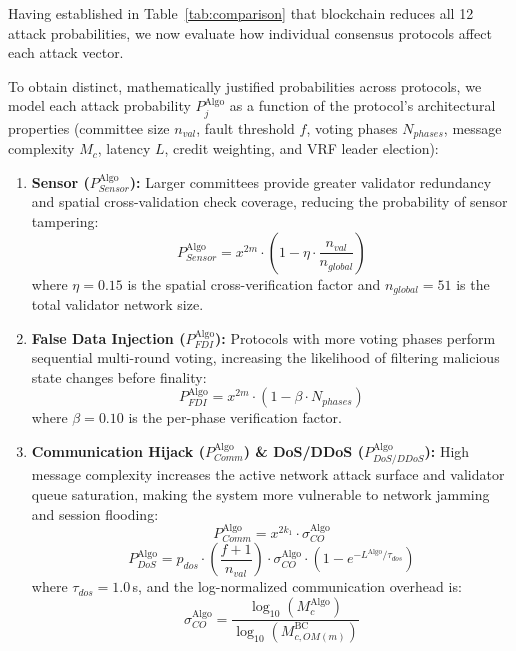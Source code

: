 \documentclass[10pt,twocolumn,journal]{IEEEtran}
\begin{document}
Having established in Table~\ref{tab:comparison} that blockchain reduces all 12 attack probabilities, we now evaluate how individual consensus protocols affect each attack vector. 

To obtain distinct, mathematically justified probabilities across protocols, we model each attack probability $P_j^{\text{Algo}}$ as a function of the protocol's architectural properties (committee size $n_{val}$, fault threshold $f$, voting phases $N_{phases}$, message complexity $M_c$, latency $L$, credit weighting, and VRF leader election):
\begin{enumerate}[leftmargin=*]
    \item \textbf{Sensor ($P_{Sensor}^{\text{Algo}}$):} Larger committees provide greater validator redundancy and spatial cross-validation check coverage, reducing the probability of sensor tampering:
    \begin{equation}
    P_{Sensor}^{\text{Algo}} = x^{2m} \cdot \left(1 - \eta \cdot \frac{n_{val}}{n_{global}}\right)
    \end{equation}
    where $\eta = 0.15$ is the spatial cross-verification factor and $n_{global}=51$ is the total validator network size.
    
    \item \textbf{False Data Injection ($P_{FDI}^{\text{Algo}}$):} Protocols with more voting phases perform sequential multi-round voting, increasing the likelihood of filtering malicious state changes before finality:
    \begin{equation}
    P_{FDI}^{\text{Algo}} = x^{2m} \cdot \left(1 - \beta \cdot N_{phases}\right)
    \end{equation}
    where $\beta = 0.10$ is the per-phase verification factor.
    
    \item \textbf{Communication Hijack ($P_{Comm}^{\text{Algo}}$) \& DoS/DDoS ($P_{DoS/DDoS}^{\text{Algo}}$):} High message complexity increases the active network attack surface and validator queue saturation, making the system more vulnerable to network jamming and session flooding:
    \begin{equation}
    P_{Comm}^{\text{Algo}} = x^{2k_1} \cdot \sigma_{CO}^{\text{Algo}}
    \end{equation}
    \begin{equation}
    P_{DoS}^{\text{Algo}} = p_{dos} \cdot \left(\frac{f+1}{n_{val}}\right) \cdot \sigma_{CO}^{\text{Algo}} \cdot \left(1 - e^{-L^{\text{Algo}} / \tau_{dos}}\right)
    \end{equation}
    where $\tau_{dos}=1.0$\,s, and the log-normalized communication overhead is:
    \begin{equation}
    \sigma_{CO}^{\text{Algo}} = \frac{\log_{10}(M_c^{\text{Algo}})}{\log_{10}(M_{c,OM(m)}^{\text{BC}})}
    \end{equation}
    

\end{enumerate}
\end{document}
